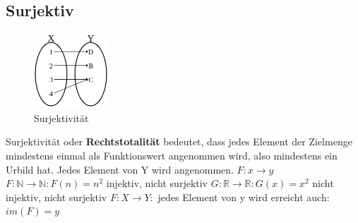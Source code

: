 \subsection{Surjektiv}
\begin{figure}
  \vspace{-20pt}
  \begin{center}
    \includegraphics[width=0.25\textwidth]{Bilder/surjektiv}
  \end{center}
  \vspace{-20pt}
  \caption{Surjektivität}
  \vspace{-10pt}
\end{figure}

Surjektivität oder \textbf{Rechtstotalität} bedeutet, dass jedes
    Element der Zielmenge mindestens einmal als Funktionswert angenommen
    wird, also mindestens ein Urbild hat. Jedes Element von Y wird
    angenommen.
\(F: x \rightarrow y\) \newline
\(F: \mathbb{N} \rightarrow \mathbb{N}: F(n) = n^2 \) injektiv, nicht surjektiv\newline
\(G: \mathbb{R} \rightarrow \mathbb{R}: G(x) = x^2 \) nicht injektiv, nicht surjektiv\newline
\(F: X \rightarrow Y:\) jedes Element von y wird erreicht auch: \(im(F) =y\)

